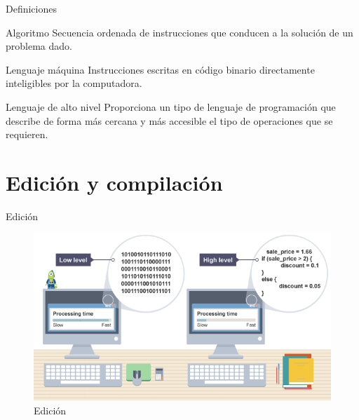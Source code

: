 \documentclass{beamer}
\begin{document}
\begin{frame}[t]{Definiciones}\vspace{4pt}
\begin{block}{Algoritmo}
Secuencia ordenada de instrucciones que conducen a la solución de un problema dado.
\end{block}
\begin{block}{Lenguaje máquina}
Instrucciones escritas en código binario directamente inteligibles por la computadora.
\end{block}
\begin{block}{Lenguaje de alto nivel}
Proporciona un tipo de lenguaje de programación que describe de forma más cercana y más accesible el tipo de operaciones que se requieren.
\end{block}
\end{frame}

\section{Edición y compilación}

\begin{frame}[t]{Edición}\vspace{3pt}
\begin{figure}
	\centering
	\includegraphics[scale=0.45]{lowhigh}
	\caption{Edición}
\end{figure}
\end{frame}
\end{document}
